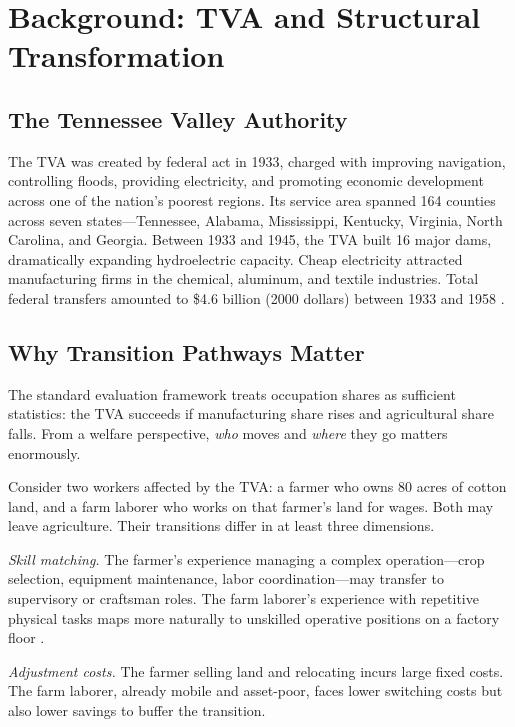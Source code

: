 \documentclass[12pt]{article}
\begin{document}
\section{Background: TVA and Structural Transformation}
\label{sec:background}

\subsection{The Tennessee Valley Authority}

The TVA was created by federal act in 1933, charged with improving navigation, controlling floods, providing electricity, and promoting economic development across one of the nation's poorest regions. Its service area spanned 164 counties across seven states---Tennessee, Alabama, Mississippi, Kentucky, Virginia, North Carolina, and Georgia. Between 1933 and 1945, the TVA built 16 major dams, dramatically expanding hydroelectric capacity. Cheap electricity attracted manufacturing firms in the chemical, aluminum, and textile industries. Total federal transfers amounted to \$4.6 billion (2000 dollars) between 1933 and 1958 \citep{kline2014}.

\subsection{Why Transition Pathways Matter}

The standard evaluation framework treats occupation shares as sufficient statistics: the TVA succeeds if manufacturing share rises and agricultural share falls. From a welfare perspective, \textit{who} moves and \textit{where} they go matters enormously.

Consider two workers affected by the TVA: a farmer who owns 80 acres of cotton land, and a farm laborer who works on that farmer's land for wages. Both may leave agriculture. Their transitions differ in at least three dimensions.

\textit{Skill matching.} The farmer's experience managing a complex operation---crop selection, equipment maintenance, labor coordination---may transfer to supervisory or craftsman roles. The farm laborer's experience with repetitive physical tasks maps more naturally to unskilled operative positions on a factory floor \citep{autor2003, deming2020}.

\textit{Adjustment costs.} The farmer selling land and relocating incurs large fixed costs. The farm laborer, already mobile and asset-poor, faces lower switching costs but also lower savings to buffer the transition.
\end{document}
